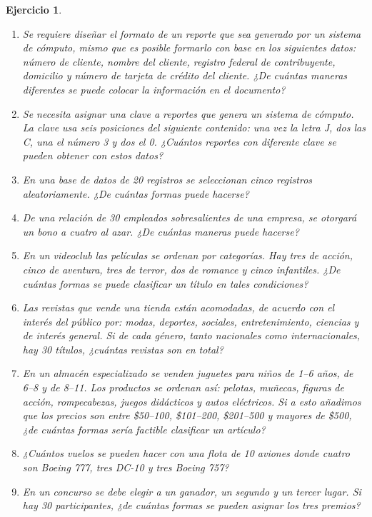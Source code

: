 \documentclass[12pt,twoside]{article}
\newtheorem{Ejer}{Ejercicio}
\begin{document}
\begin{Ejer}
\begin{enumerate}
\item Se requiere diseñar el formato de un reporte que sea generado por un sistema de cómputo, mismo que es posible formarlo con base en los siguientes datos: número de cliente, nombre del cliente, registro federal de contribuyente, domicilio y número de tarjeta de crédito del cliente. ¿De cuántas maneras diferentes se puede colocar la información en el documento?

\item Se necesita asignar una clave a reportes que genera un sistema de cómputo. La clave usa seis posiciones del siguiente contenido: una vez la letra J, dos las C, una el número 3 y dos el 0. ¿Cuántos reportes con diferente clave se pueden obtener con estos datos?

\item En una base de datos de 20 registros se seleccionan cinco registros aleatoriamente. ¿De cuántas formas puede hacerse?

\item De una relación de 30 empleados sobresalientes de una empresa, se otorgará un bono a cuatro al azar. ¿De cuántas maneras puede hacerse?

\item En un videoclub las películas se ordenan por categorías. Hay tres de acción, cinco de aventura, tres de terror, dos de romance y cinco infantiles. ¿De cuántas formas se puede clasificar un título en tales condiciones?

\item Las revistas que vende una tienda están acomodadas, de acuerdo con el interés del público por: modas, deportes, sociales, entretenimiento, ciencias y de interés general. Si de cada género, tanto nacionales como internacionales, hay 30 títulos, ¿cuántas revistas son en total?

\item En un almacén especializado se venden juguetes para niños de 1--6 años, de 6--8 y de 8--11. Los productos se ordenan así: pelotas, muñecas, figuras de acción, rompecabezas, juegos didácticos y autos eléctricos. Si a esto añadimos que los precios son entre \$50--100, \$101--200, \$201--500 y mayores de \$500, ¿de cuántas formas sería factible clasificar un artículo?

\item ¿Cuántos vuelos se pueden hacer con una flota de 10 aviones donde cuatro son Boeing 777, tres DC-10 y tres Boeing 757?

\item En un concurso se debe elegir a un ganador, un segundo y un tercer lugar. Si hay 30 participantes, ¿de cuántas formas se pueden asignar los tres premios?


\end{enumerate}
\end{Ejer}
\end{document}
